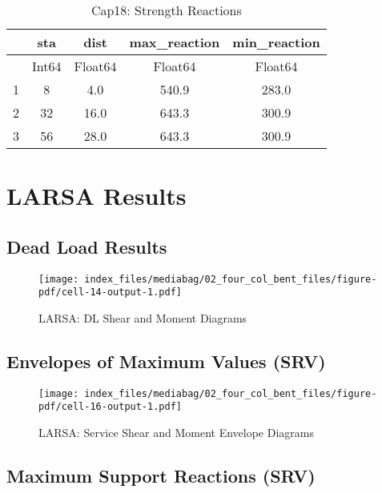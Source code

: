 \documentclass[
  letterpaper,
  DIV=11,
  numbers=noendperiod]{scrreprt}
\begin{document}
\begin{table}
\caption{Cap18: Strength Reactions}\tabularnewline

\centering
\begin{tabular}{r|cccc}
    & sta & dist & max\_reaction & min\_reaction\\
    \hline
    & Int64 & Float64 & Float64 & Float64\\
    \hline
    1 & 8 & 4.0 & 540.9 & 283.0 \\
    2 & 32 & 16.0 & 643.3 & 300.9 \\
    3 & 56 & 28.0 & 643.3 & 300.9 \\
\end{tabular}
\end{table}

\section{LARSA Results}\label{larsa-results}

\subsection{Dead Load Results}\label{dead-load-results}

\begin{figure}[H]

{\centering \texttt{[image: index\_files/mediabag/02\_four\_col\_bent\_files/figure-pdf/cell-14-output-1.pdf]}

}

\caption{LARSA: DL Shear and Moment Diagrams}

\end{figure}%

\subsection{Envelopes of Maximum Values
(SRV)}\label{envelopes-of-maximum-values-srv-1}

\begin{figure}[H]

{\centering \texttt{[image: index\_files/mediabag/02\_four\_col\_bent\_files/figure-pdf/cell-16-output-1.pdf]}

}

\caption{LARSA: Service Shear and Moment Envelope Diagrams}

\end{figure}%

\subsection{Maximum Support Reactions
(SRV)}\label{maximum-support-reactions-srv-1}
\end{document}
